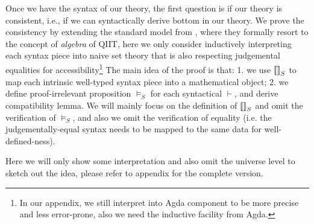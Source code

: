 Once we have the syntax of our theory, the first question is if our theory is consistent, i.e., if we can syntactically derive bottom in our theory. We prove the consistency by extending the standard model from \citep{kaposi2017type}, where they formally resort to the concept of \textit{algebra} of QIIT, here we only consider inductively interpreting each syntax piece into naive set theory that is also respecting judgemental equalities for accessibility\footnote{In our appendix, we still interpret into Agda component to be more precise and less error-prone, also we need the inductive facility from Agda.} The main idea of the proof is that: 1. we use ${{\llbracket {} \rrbracket}_S}$ to map each intrinsic well-typed syntax piece into a mathematical object; 2. we define proof-irrelevant proposition $\models_S$ for each syntactical $\vdash$, and derive compatibility lemma. We will mainly focus on the definition of ${{\llbracket {} \rrbracket}_S}$ and omit the verification of $\models_S$, and also we omit the verification of equality (i.e. the judgementally-equal syntax needs to be mapped to the same data for well-defined-ness).

Here we will only show some interpretation and also omit the universe level to sketch out the idea, please refer to appendix for the complete version. 

\newcommand{\goodCtxS}[2]{{ {#1} \ \models_S }}
\newcommand{\goodTypeS}[3]{{ {#1} \models_S {#2} }}
\newcommand{\goodTermS}[3]{{ {#1} \models_S {#2} : {#3} }}
\newcommand{\goodSubS}[3]{{ {#1} \models_S {#2} : {#3} }}
\newcommand{\goodSigS}[3]{{ {#1} \models_S {#2} \ \  Sig^{#3} }}
\newcommand{\goodWSigS}[3]{{ {#1} \models_S {#2} \ \ WSig^{#3} }}
\newcommand{\goodSealS}[4]{{ {#1} \models_S {#2} : {#3} \  |\  {#4} }}
\newcommand{\goodInhS}[4]{{ {#1} \models_S {#2} : {#3} \twoheadrightarrow {#4}}}

